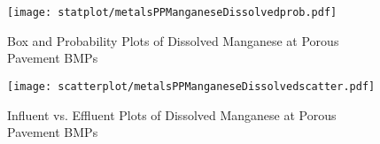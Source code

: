         \begin{figure}[hb]   %
            \centering
            \texttt{[image: statplot/metalsPPManganeseDissolvedprob.pdf]}
            \caption{Box and Probability Plots of Dissolved Manganese at Porous Pavement BMPs}
        \end{figure}         %
        
        
        \begin{figure}[hb]   %
            \centering
            \texttt{[image: scatterplot/metalsPPManganeseDissolvedscatter.pdf]}
            \caption{Influent vs. Effluent Plots of Dissolved Manganese at Porous Pavement BMPs}
        \end{figure}         %
        \clearpage
        